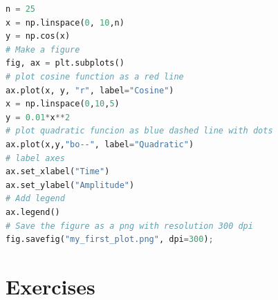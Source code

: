 \documentclass[a4paper , 12pt]{book}
\begin{document}
\begin{center}
\begin{lstlisting}[language=Python, frame=single]
n = 25
x = np.linspace(0, 10,n)
y = np.cos(x)
# Make a figure
fig, ax = plt.subplots()
# plot cosine function as a red line
ax.plot(x, y, "r", label="Cosine")
x = np.linspace(0,10,5)
y = 0.01*x**2
# plot quadratic funcion as blue dashed line with dots
ax.plot(x,y,"bo--", label="Quadratic")
# label axes
ax.set_xlabel("Time")
ax.set_ylabel("Amplitude")
# Add legend
ax.legend()
# Save the figure as a png with resolution 300 dpi
fig.savefig("my_first_plot.png", dpi=300);
\end{lstlisting}
\end{center}

\section{Exercises}
\end{document}
